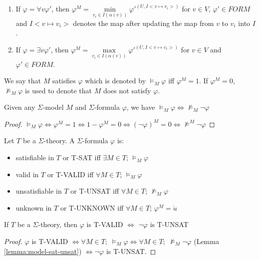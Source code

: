\begin{definition}
\begin{enumerate}
\item If $\varphi = \forall v \varphi'$, then $\varphi^M = \min\limits_{v_i \in I(\alpha(v))}\varphi'^{(U, I<v \mapsto v_i>)}$ for $v \in V$,  $\varphi' \in FORM$ and $I<v \mapsto v_i>$ denotes the map after updating the map from $v$ to $v_i$ into $I$.
\item If $\varphi = \exists v \varphi'$, then $\varphi^M = \max\limits_{v_i \in I(\alpha(v))}\varphi'^{(U, I<v \mapsto v_i>)}$ for $v \in V$ and  $\varphi' \in FORM$.
\end{enumerate}
We say that $M$ satisfies $\varphi$ which is denoted by $\models_M \varphi$ iff $\varphi^M = 1$. If $\varphi^M = 0$, $\not\models_M \varphi$ is used to denote that $M$ does not satisfy $\varphi$.
\end{definition}

\begin{lemma}\label{lemma:model-sat-unsat}
Given any $\Sigma$-model $M$ and $\Sigma$-formula $\varphi$, we have $\models_M \varphi \iff \not\models_M \neg \varphi$
\end{lemma}

\begin{proof}
$\models_M \varphi \iff \varphi^M = 1 \iff 1 - \varphi^M = 0 \iff (\neg \varphi)^M = 0 \iff \not\models^M \neg \varphi$
\end{proof}

\begin{definition}
Let $T$ be a $\Sigma$-theory. A $\Sigma$-formula $\varphi$ is:
\begin{itemize}
\item satisfiable in $T$ or T-SAT iff $\exists M \in T$; $\models_{M} \varphi$
\item valid in $T$ or T-VALID iff $\forall M \in T$; $\models_{M} \varphi$
\item unsatisfiable in $T$ or T-UNSAT iff $\forall M \in T$; $\not\models_{M} \varphi$
\item unknown in $T$ or T-UNKNOWN iff $\forall M \in T$; $\varphi^M = \mathring{u}$
\end{itemize}
\end{definition}

\begin{lemma} \label{lemma:theory-valid-unsat}
If $T$ be a $\Sigma$-theory, then $\varphi$ is T-VALID $\iff$ $\neg\varphi$ is T-UNSAT
\end{lemma}

\begin{proof}
$\varphi$ is T-VALID $\iff \forall M \in T; \; \models_{M} \varphi \iff \forall M \in T; \; \not\models_{M} \neg\varphi$ (Lemma \ref{lemma:model-sat-unsat}) $\iff \neg\varphi$ is T-UNSAT.
\end{proof}

